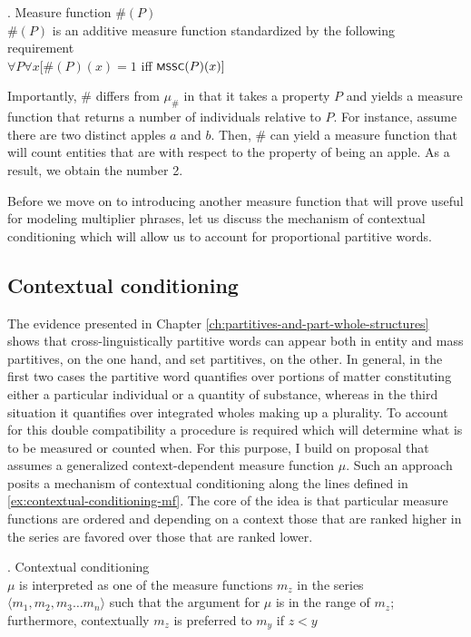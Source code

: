 	\ex. Measure function $\#(P)$\\
	$\#(P)$ is an additive measure function standardized by the following requirement\\
	$\forall P\forall x[\#(P)(x) = 1$ iff $\cnst{mssc}(P)(x)]$\label{ex:mf-hash(P)}
	
	Importantly, $\#$ differs from $\mu_\#$ in that it takes a property $P$ and yields a measure function that returns a number of  individuals relative to $P$. For instance, assume there are two distinct apples $a$ and $b$. Then, $\#$ can yield a measure function that will count entities that are  with respect to the property of being an apple. As a result, we obtain the number 2.
	
	Before we move on to introducing another measure function that will prove useful for modeling multiplier phrases, let us discuss the mechanism of contextual conditioning which will allow us to account for proportional partitive words.
	
	\subsection{Contextual conditioning}\label{sec:contextual-conditioning}
	
	The evidence presented in Chapter \ref{ch:partitives-and-part-whole-structures} shows that cross-linguistically partitive words can appear both in entity and mass partitives, on the one hand, and set partitives, on the other. In general, in the first two cases the partitive word quantifies over portions of matter constituting either a particular individual or a quantity of substance, whereas in the third situation it quantifies over integrated wholes making up a plurality. To account for this double compatibility a procedure is required which will determine what is to be measured or counted when. For this purpose, I build on  proposal that assumes a generalized context-dependent measure function $\mu$. Such an approach posits a mechanism of contextual conditioning along the lines defined in \ref{ex:contextual-conditioning-mf}. The core of the idea is that particular measure functions are ordered and depending on a context those that are ranked higher in the series are favored over those that are ranked lower. 
	
	\ex. Contextual conditioning \citep[p. 245; adapted]{bale_barner2009interpretation}\\
	$\mu$ is interpreted as one of the measure functions $m_z$ in the series\\ $\langle m_1, m_2, m_3\dots m_n\rangle$ such that the argument for $\mu$ is in the range of $m_z$;\\ furthermore, contextually $m_z$ is preferred to $m_y$ if $z<y$\label{ex:contextual-conditioning-mf}
	
